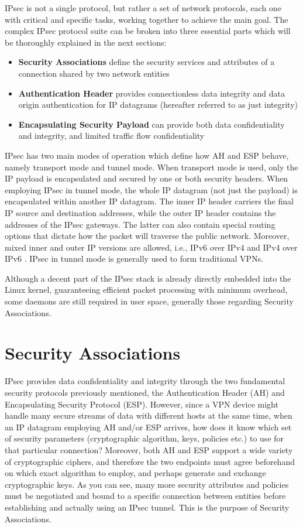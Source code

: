 \documentclass[a4paper,12pt]{report}
\begin{document}
		IPsec is not a single protocol, but rather a set of network protocols, each one with critical and specific tasks, working together to achieve the main goal. The complex IPsec protocol suite can be broken into three essential parts which will be thoroughly explained in the next sections:
		\begin{itemize}
			\item \textbf{Security Associations} define the security services and attributes of a connection shared by two network entities
			\item \textbf{Authentication Header} provides connectionless data integrity and data origin authentication for IP datagrams (hereafter referred to as just integrity) \cite{rfc4302}
			\item \textbf{Encapsulating Security Payload} can provide both data confidentiality and integrity, and limited traffic flow confidentiality \cite{rfc2406}
		\end{itemize}
		
		IPsec has two main modes of operation which define how AH and ESP behave, namely transport mode and tunnel mode. When transport mode is used, only the IP payload is encapsulated and secured by one or both security headers. When employing IPsec in tunnel mode, the whole IP datagram (not just the payload) is encapsulated within another IP datagram. The inner IP header carriers the final IP source and destination addresses, while the outer IP header contains the addresses of the IPsec gateways. The latter can also contain special routing options that dictate how the packet will traverse the public network. Moreover, mixed inner and outer IP versions are allowed, i.e., IPv6 over IPv4 and IPv4 over IPv6 \cite{rfc4302}. IPsec in tunnel mode is generally used to form traditional VPNs.
		
		Although a decent part of the IPsec stack is already directly embedded into the Linux kernel, guaranteeing efficient packet processing with minimum overhead, some daemons are still required in user space, generally those regarding Security Associations.
		
	\section{Security Associations}
	IPsec provides data confidentiality and integrity through the two fundamental security protocols previously mentioned, the Authentication Header (AH) and Encapsulating Security Protocol (ESP). However, since a VPN device might handle many secure streams of data with different hosts at the same time, when an IP datagram employing AH and/or ESP arrives, how does it know which set of security parameters (cryptographic algorithm, keys, policies etc.) to use for that particular connection? Moreover, both AH and ESP support a wide variety of cryptographic ciphers, and therefore the two endpoints must agree beforehand on which exact algorithm to employ, and perhaps generate and exchange cryptographic keys. As you can see, many more security attributes and policies must be negotiated and bound to a specific connection between entities before establishing and actually using an IPsec tunnel. This is the purpose of Security Associations. 
	
\end{document}
